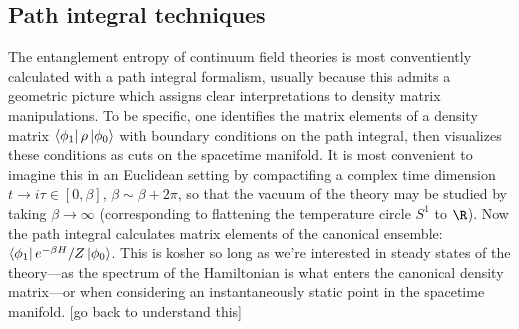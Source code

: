 \documentclass{report}
\begin{document}
\subsection{Path integral techniques}
The entanglement entropy of continuum field theories is most conventiently 
calculated with a path integral formalism, usually because this admits a geometric 
picture which assigns clear interpretations to density matrix manipulations. 
To be specific, one identifies the matrix elements of a density matrix $\bra{\phi_1} \rho \ket{\phi_0}$
with boundary conditions on the path integral, then visualizes these conditions 
as cuts on the spacetime manifold. It is most convenient to imagine this in an
Euclidean setting by compactifing a complex time dimension $ t \rightarrow i\tau
\in [0, \beta] $, $ \beta\sim \beta + 2\pi $, so that the vacuum of the theory
may be studied by taking $ \beta \rightarrow \infty $ (corresponding to
flattening the temperature circle $ S^1 $ to $ \R $). Now the path integral 
calculates matrix elements of the canonical ensemble: $ \bra{\phi_1} e^{-\beta H}/ Z\ket{\phi_0} $.
This is kosher so long as we're interested in steady states of the theory---as 
the spectrum of the Hamiltonian is what enters the canonical density matrix---or when
considering an instantaneously static point in the spacetime manifold. 
{\color{myred} [go back to understand this]}
\end{document}
